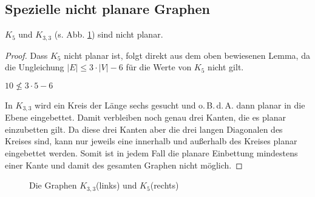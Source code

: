 \subsection{Spezielle nicht planare Graphen}
\begin{fakt} $K_5$ und $K_{3,3}$  (s. Abb. \ref{k33uk5}) sind nicht planar.\end{fakt} 
\begin{proof} Dass $K_5$ nicht planar ist, folgt direkt aus dem oben bewiesenen Lemma, da die Ungleichung $|E| \leq 3 \cdot |V| -6$ für die Werte von $K_5$ nicht gilt. \\
\begin{center}
$10 \not\leq 3\cdot 5 -6$
\end{center}
In $K_{3,3}$ wird ein Kreis der Länge sechs gesucht und o.\,B.\,d.\,A. dann planar in die Ebene eingebettet. Damit verbleiben noch genau drei Kanten, die es planar einzubetten gilt. Da diese drei Kanten aber die drei langen Diagonalen des Kreises sind, kann nur jeweils eine innerhalb und außerhalb des Kreises planar eingebettet werden. Somit ist in jedem Fall die planare Einbettung mindestens einer Kante und damit des gesamten Graphen nicht möglich. 
\end{proof}
\begin{figure}
	\centering
	\caption{Die Graphen $K_{3,3}$(links) und $K_5$(rechts)}
	\label{k33uk5}
\end{figure}
